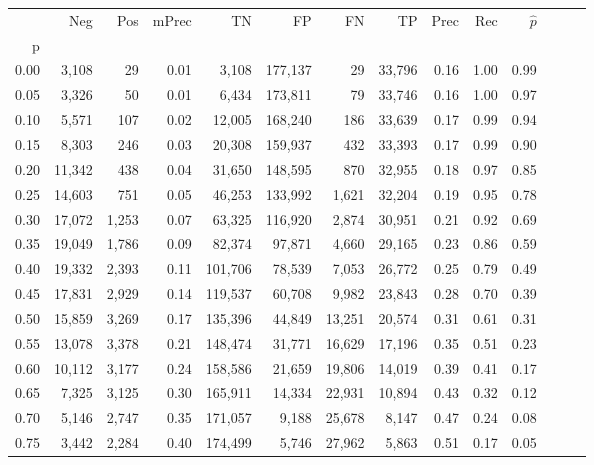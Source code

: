 \begin{tabular}{rrrrrrrrrrrrrr}
\toprule
{} &     Neg &    Pos & mPrec &       TN &       FP &      FN &      TP &  Prec &   Rec & $\hat{p}$ \\
p    &         &        &       &          &          &         &         &       &       &           \\
\midrule
0.00 &   3,108 &     29 &  0.01 &    3,108 &  177,137 &      29 &  33,796 &  0.16 &  1.00 &      0.99 \\
0.05 &   3,326 &     50 &  0.01 &    6,434 &  173,811 &      79 &  33,746 &  0.16 &  1.00 &      0.97 \\
0.10 &   5,571 &    107 &  0.02 &   12,005 &  168,240 &     186 &  33,639 &  0.17 &  0.99 &      0.94 \\
0.15 &   8,303 &    246 &  0.03 &   20,308 &  159,937 &     432 &  33,393 &  0.17 &  0.99 &      0.90 \\
0.20 &  11,342 &    438 &  0.04 &   31,650 &  148,595 &     870 &  32,955 &  0.18 &  0.97 &      0.85 \\
0.25 &  14,603 &    751 &  0.05 &   46,253 &  133,992 &   1,621 &  32,204 &  0.19 &  0.95 &      0.78 \\
0.30 &  17,072 &  1,253 &  0.07 &   63,325 &  116,920 &   2,874 &  30,951 &  0.21 &  0.92 &      0.69 \\
0.35 &  19,049 &  1,786 &  0.09 &   82,374 &   97,871 &   4,660 &  29,165 &  0.23 &  0.86 &      0.59 \\
0.40 &  19,332 &  2,393 &  0.11 &  101,706 &   78,539 &   7,053 &  26,772 &  0.25 &  0.79 &      0.49 \\
0.45 &  17,831 &  2,929 &  0.14 &  119,537 &   60,708 &   9,982 &  23,843 &  0.28 &  0.70 &      0.39 \\
0.50 &  15,859 &  3,269 &  0.17 &  135,396 &   44,849 &  13,251 &  20,574 &  0.31 &  0.61 &      0.31 \\
0.55 &  13,078 &  3,378 &  0.21 &  148,474 &   31,771 &  16,629 &  17,196 &  0.35 &  0.51 &      0.23 \\
0.60 &  10,112 &  3,177 &  0.24 &  158,586 &   21,659 &  19,806 &  14,019 &  0.39 &  0.41 &      0.17 \\
0.65 &   7,325 &  3,125 &  0.30 &  165,911 &   14,334 &  22,931 &  10,894 &  0.43 &  0.32 &      0.12 \\
0.70 &   5,146 &  2,747 &  0.35 &  171,057 &    9,188 &  25,678 &   8,147 &  0.47 &  0.24 &      0.08 \\
0.75 &   3,442 &  2,284 &  0.40 &  174,499 &    5,746 &  27,962 &   5,863 &  0.51 &  0.17 &      0.05 \\

\end{tabular}
